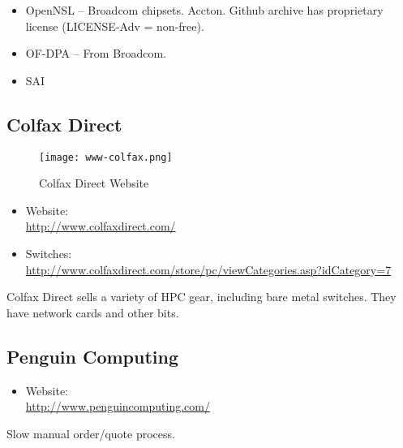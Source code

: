 \begin{itemize}
 \item OpenNSL -- Broadcom chipsets. Accton. Github archive has proprietary
   license (LICENSE-Adv = non-free).
 \item OF-DPA -- From Broadcom.
 \item SAI 
\end{itemize}


\subsection{Colfax Direct}
\begin{figure}[h!]
\texttt{[image: www-colfax.png]}
 \caption{Colfax Direct Website}
 \label{fig:www-colfax}
\end{figure}


\begin{itemize}
 \item Website: \\ \url{http://www.colfaxdirect.com/}
 \item Switches: \\ \url{http://www.colfaxdirect.com/store/pc/viewCategories.asp?idCategory=7}
\end{itemize}


Colfax Direct sells a variety of HPC gear, including bare metal switches.
They have network cards and other bits.


\subsection{Penguin Computing}
\begin{itemize}
 \item Website: \\ \url{http://www.penguincomputing.com/}
\end{itemize}


Slow manual order/quote process.


